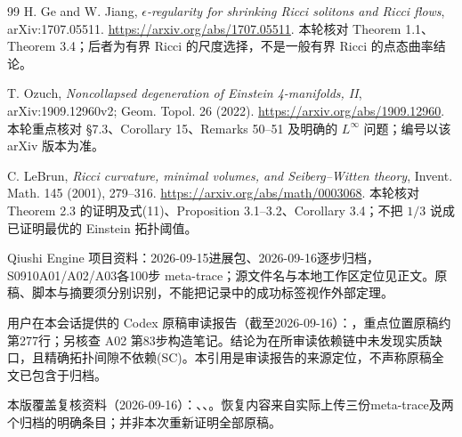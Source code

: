 \documentclass[UTF8,a4paper,11pt,fontset=fandol]{ctexart}
\numberwithin{equation}{section}
\theoremstyle{definition}
\begin{document}
\begin{thebibliography}{99}
 H. Ge and W. Jiang, \emph{$\epsilon$-regularity for shrinking Ricci solitons and Ricci flows}, arXiv:1707.05511. \url{https://arxiv.org/abs/1707.05511}. 本轮核对 Theorem 1.1、Theorem 3.4；后者为有界 Ricci 的尺度选择，不是一般有界 Ricci 的点态曲率结论。

 T. Ozuch, \emph{Noncollapsed degeneration of Einstein 4-manifolds, II}, arXiv:1909.12960v2; Geom. Topol. 26 (2022). \url{https://arxiv.org/abs/1909.12960}. 本轮重点核对 \S7.3、Corollary 15、Remarks 50--51 及明确的 $L^\infty$ 问题；编号以该 arXiv 版本为准。

 C. LeBrun, \emph{Ricci curvature, minimal volumes, and Seiberg--Witten theory}, Invent. Math. 145 (2001), 279--316. \url{https://arxiv.org/abs/math/0003068}. 本轮核对 Theorem 2.3 的证明及式(11)、Proposition 3.1--3.2、Corollary 3.4；不把 $1/3$ 说成已证明最优的 Einstein 拓扑阈值。

 Qiushi Engine 项目资料：2026-09-15进展包、2026-09-16逐步归档，S0910A01/A02/A03各100步 meta-trace；源文件名与本地工作区定位见正文。原稿、脚本与摘要须分别识别，不能把记录中的成功标签视作外部定理。

 用户在本会话提供的 Codex 原稿审读报告（截至2026-09-16）：，重点位置原稿约第277行；另核查 A02 第83步构造笔记。结论为在所审读依赖链中未发现实质缺口，且精确拓扑间隙不依赖(SC)。本引用是审读报告的来源定位，不声称原稿全文已包含于归档。

 本版覆盖复核资料（2026-09-16）：、、。恢复内容来自实际上传三份meta-trace及两个归档的明确条目；并非本次重新证明全部原稿。
\end{thebibliography}
\end{document}

